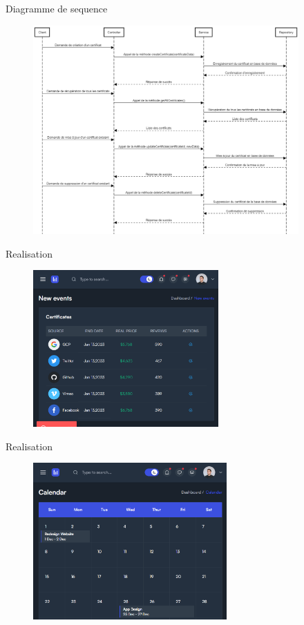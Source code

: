 \documentclass[aspectratio=169]{beamer}
\begin{document}
\begin{frame}{Diagramme de sequence}
    \begin{figure}[htpb]
        \centering
        \includegraphics[height=8cm]{pic/seq-certifs.png}
    \end{figure}
\end{frame}

\begin{frame}{Realisation}
    \begin{figure}[htpb]
        \centering
        \includegraphics[height=6cm]{pic/certifs-list.png}
    \end{figure}
\end{frame}

\begin{frame}{Realisation}
    \begin{figure}[htpb]
        \centering
        \includegraphics[height=6cm]{pic/calendar.png}
    \end{figure}
\end{frame}
\end{document}
